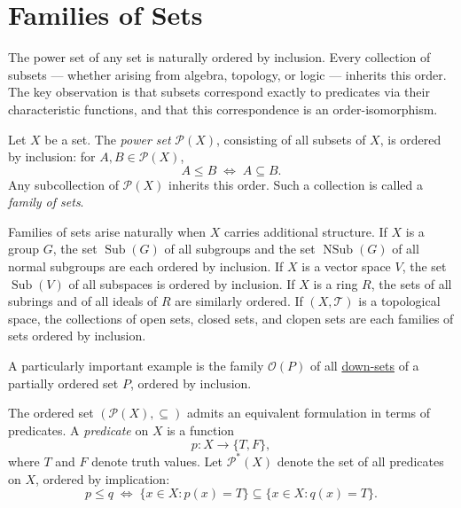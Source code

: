 
\section{Families of Sets}
\label{sec:families-of-sets}

\begin{tcolorbox}[
  colback=gray!6,
  colframe=gray!40,
  arc=2pt,
  left=8pt, right=8pt, top=6pt, bottom=6pt,
  title={\small\textbf{Toolkit: Families of Sets}},
  fonttitle=\small\bfseries
]
The power set of any set is naturally ordered by inclusion.  Every
collection of subsets — whether arising from algebra, topology, or logic
— inherits this order.  The key observation is that subsets correspond
exactly to predicates via their characteristic functions, and that this
correspondence is an order-isomorphism.
\end{tcolorbox}

Let $X$ be a set.  The \emph{power set} $\mathcal{P}(X)$, consisting of
all subsets of $X$, is ordered by inclusion: for $A, B \in \mathcal{P}(X)$,
\[
A \leq B \;\Longleftrightarrow\; A \subseteq B.
\]
Any subcollection of $\mathcal{P}(X)$ inherits this order.  Such a
collection is called a \emph{family of sets}.

Families of sets arise naturally when $X$ carries additional structure.
If $X$ is a group $G$, the set $\operatorname{Sub}(G)$ of all subgroups
and the set $\operatorname{NSub}(G)$ of all normal subgroups are each
ordered by inclusion.  If $X$ is a vector space $V$, the set
$\operatorname{Sub}(V)$ of all subspaces is ordered by inclusion.  If $X$
is a ring $R$, the sets of all subrings and of all ideals of $R$ are
similarly ordered.  If $(X, \mathcal{T})$ is a topological space, the
collections of open sets, closed sets, and clopen sets are each families
of sets ordered by inclusion.

A particularly important example is the family $\mathcal{O}(P)$ of all
\hyperref[def:down-set]{down-sets} of a partially ordered set $P$,
ordered by inclusion.

\medskip

The ordered set $(\mathcal{P}(X), \subseteq)$ admits an equivalent
formulation in terms of predicates.  A \emph{predicate} on $X$ is a
function
\[
p : X \to \{T, F\},
\]
where $T$ and $F$ denote truth values.  Let $\mathcal{P}^*(X)$ denote
the set of all predicates on $X$, ordered by implication:
\[
p \leq q
\;\Longleftrightarrow\;
\{x \in X : p(x) = T\} \subseteq \{x \in X : q(x) = T\}.
\]

